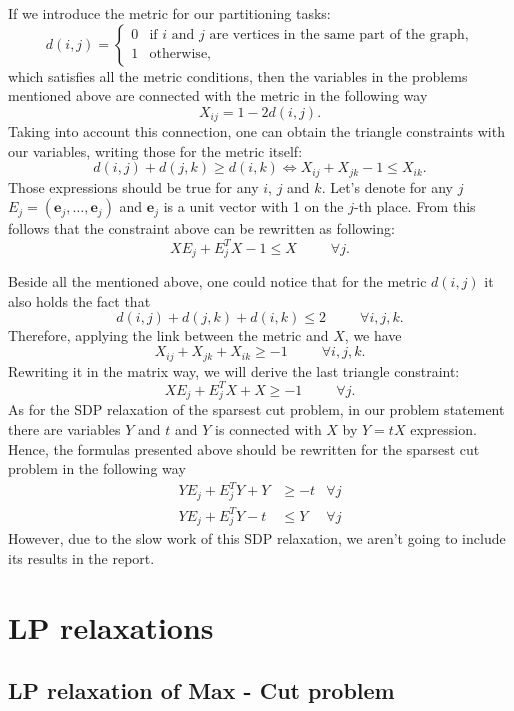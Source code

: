 \documentclass[12pt]{article}
\begin{document}
If we introduce the metric for our partitioning tasks:
\[
d(i,j) = \begin{cases}
    0 & \text{if $i$ and $j$ are vertices in the same part of the graph,}\\
    1 & \text{otherwise,}
\end{cases}
\]
which satisfies all the metric conditions, then the variables in the problems mentioned above are connected with the metric in the following way
\[
X_{ij} = 1 - 2d(i,j).
\]
Taking into account this connection, one can obtain the triangle constraints with our variables, writing those for the metric itself:
\[
d(i,j) + d(j, k) \geq d(i,k) \Leftrightarrow X_{ij} + X_{jk} - 1 \leq X_{ik}. 
\]
Those expressions should be true for any $i$, $j$ and $k$. Let's denote for any $j$ $E_j = (\mathbf{e}_j, \dots, \mathbf{e}_j)$ and $\mathbf{e}_j$ is a unit vector with 1 on the $j$-th place. From this follows that the constraint above can be rewritten as following:
\[
XE_j + E_j^T X - 1 \leq X ~~~~~~~~~~~ \forall j. 
\]

Beside all the mentioned above, one could notice that for the metric $d(i,j)$ it also holds the fact that
\[
d(i,j) + d(j,k) + d(i,k) \leq 2 ~~~~~~~~~~~ \forall i, j, k.
\]
Therefore, applying the link between the metric and $X$, we have
\[
X_{ij} + X_{jk} + X_{ik} \geq -1 ~~~~~~~~~~~ \forall i, j, k.
\]
Rewriting it in the matrix way, we will derive the last triangle constraint:
\[
XE_j + E_j^T X + X \geq -1 ~~~~~~~~~~~ \forall j.
\]
As for the SDP relaxation of the sparsest cut problem, in our problem statement there are variables $Y$ and $t$ and $Y$ is connected with $X$ by $Y = tX$ expression. Hence, the formulas presented above should be rewritten for the sparsest cut problem in the following way
\begin{align*}
    YE_j + E_j^T Y + Y &\geq -t  &\forall j \\
    YE_j + E_j^T Y - t &\leq Y  &\forall j
\end{align*}
However, due to the slow work of this SDP relaxation, we aren't going to include its results in the report.



\section{LP relaxations}

\subsection{LP relaxation of Max - Cut problem}
\end{document}
